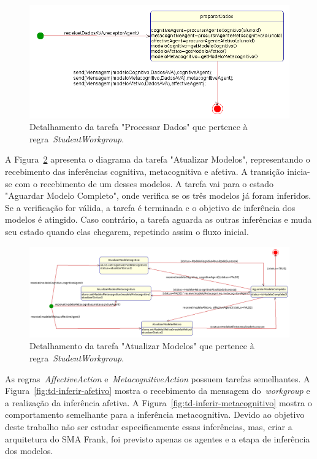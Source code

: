 \begin{figure}
	\centering
	\includegraphics[scale=0.48]{images/td-processar-dados.png}
	\caption{Detalhamento da tarefa "Processar Dados" que pertence à regra~\emph{StudentWorkgroup}.}
	\label{fig:td-processar-dados}
\end{figure}

A Figura~\ref{fig:td-atualizar-modelos} apresenta o diagrama da tarefa "Atualizar Modelos", representando o recebimento das inferências cognitiva, metacognitiva e afetiva. A transição inicia-se com o recebimento de um desses modelos. A tarefa vai para o estado "Aguardar Modelo Completo", onde verifica se os três modelos já foram inferidos. Se a verificação for válida, a tarefa é terminada e o objetivo de inferência dos modelos é atingido. Caso contrário, a tarefa aguarda as outras inferências e muda seu estado quando elas chegarem, repetindo assim o fluxo inicial.

\begin{figure}
	\centering
	\includegraphics[scale=0.4]{images/td-atualizar-modelos.png}
	\caption{Detalhamento da tarefa "Atualizar Modelos" que pertence à regra~\emph{StudentWorkgroup}.}
	\label{fig:td-atualizar-modelos}
\end{figure}

As regras~\emph{AffectiveAction} e~\emph{MetacognitiveAction} possuem tarefas semelhantes. A Figura~\ref{fig:td-inferir-afetivo} mostra o recebimento da mensagem do~\emph{workgroup} e a realização da inferência afetiva. A Figura~\ref{fig:td-inferir-metacognitivo} mostra o comportamento semelhante para a inferência metacognitiva. Devido ao objetivo deste trabalho não ser estudar especificamente essas inferências, mas, criar a arquitetura do SMA Frank, foi previsto apenas os agentes e a etapa de inferência dos modelos.

